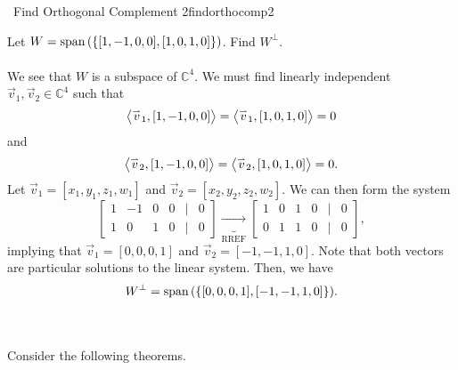         \begin{example}{\Difficulty\,\Difficulty\,\,Find Orthogonal Complement 2}{findorthocomp2}

            Let \(W=\text{span\,}(\{[1,-1,0,0],[1,0,1,0]\})\). Find \(W^\perp\).
            \\
            \\
            We see that \(W\) is a subspace of \(\mathbb{C}^4\). We must find linearly independent \(\vec{v}_1,\vec{v}_2\in\mathbb{C}^4\) such that
            \begin{equation*}
                \left\langle \overset{_{\rightharpoonup}}{v}_1,[1,-1,0,0]\right\rangle=\left\langle \overset{_{\rightharpoonup}}{v}_1,[1,0,1,0]\right\rangle=0
            \end{equation*}
            and
            \begin{equation*}
                \left\langle \overset{_{\rightharpoonup}}{v}_2,[1,-1,0,0]\right\rangle=\left\langle \overset{_{\rightharpoonup}}{v}_2,[1,0,1,0]\right\rangle=0.
            \end{equation*}
            Let \(\vec{v}_1=[x_1,y_1,z_1,w_1]\) and \(\vec{v}_2=[x_2,y_2,z_2,w_2]\). We can then form the system
            \begin{equation*}
                \begin{bmatrix}
                    1 & -1 & 0 & 0 & | & 0 \\
                    1 & 0 & 1 & 0 & | & 0
                \end{bmatrix}\underbrace{\to}_{\text{RREF}}\begin{bmatrix}
                    1 & 0 & 1 & 0 & | & 0 \\
                    0 & 1 & 1 & 0 & | & 0
                \end{bmatrix},
            \end{equation*}
            implying that \(\vec{v}_1=[0,0,0,1]\) and \(\vec{v}_2=[-1,-1,1,0]\). Note that both vectors are particular solutions to the linear system. Then, we have
            \begin{equation*}
                W^\perp=\text{span\,}(\{[0,0,0,1],[-1,-1,1,0]\}).
            \end{equation*}
            
        \end{example}
        \pagebreak
        \vphantom
        \\
        \\
        Consider the following theorems.
